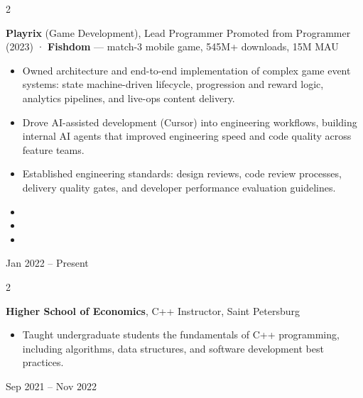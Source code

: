 \documentclass[10pt, letterpaper]{article}
\newenvironment{highlights}{
    \begin{itemize}[
        topsep=0.10 cm,
        parsep=0.10 cm,
        partopsep=0pt,
        itemsep=0pt,
        leftmargin=0.4 cm + 10pt
    ]
}{
    \end{itemize}
}
\newenvironment{twocolentry}[2][]{
    \onecolentry
    \def\secondColumn{#2}
    \setcolumnwidth{\fill, 4.5 cm}
    \begin{paracol}{2}
}{
    \switchcolumn \raggedleft \secondColumn
    \end{paracol}
    \endonecolentry
}
\begin{document}
        \begin{twocolentry}{
            Jan 2022 -- Present
        }
            \textbf{Playrix} (Game Development), Lead Programmer\newline
            {\small Promoted from Programmer (2023) · \textbf{Fishdom} --- match-3 mobile game, 545M+ downloads, 15M MAU}
            \begin{highlights}
                \item Owned architecture and end-to-end implementation of complex game event systems: state machine-driven lifecycle, progression and reward logic, analytics pipelines, and live-ops content delivery.
                \item Drove AI-assisted development (Cursor) into engineering workflows, building internal AI agents that improved engineering speed and code quality across feature teams.
                \item Established engineering standards: design reviews, code review processes, delivery quality gates, and developer performance evaluation guidelines.
                \item \PlayrixAchOne
                \item \PlayrixAchTwo
                \item \PlayrixAchThree
            \end{highlights}
        \end{twocolentry}

        \vspace{0.2 cm}

        \begin{twocolentry}{
            Sep 2021 -- Nov 2022
        }
            \textbf{Higher School of Economics}, C++ Instructor, Saint Petersburg
            \begin{highlights}
                \item Taught undergraduate students the fundamentals of C++ programming, including algorithms, data structures, and software development best practices.
            \end{highlights}
        \end{twocolentry}

        \vspace{0.2 cm}
\end{document}
